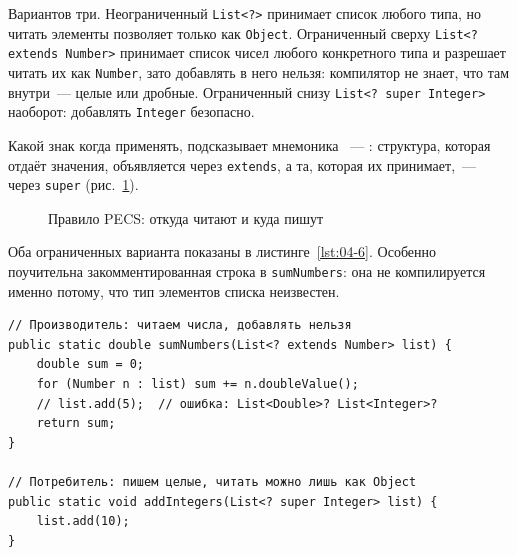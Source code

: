Вариантов три. Неограниченный \texttt{List<?>} принимает список любого типа, но
читать элементы позволяет только как \texttt{Object}. Ограниченный сверху
\texttt{List<? extends Number>} принимает список чисел любого конкретного типа
и разрешает читать их как \texttt{Number}, зато добавлять в него нельзя:
компилятор не знает, что там внутри~--- целые или дробные. Ограниченный снизу
\texttt{List<? super Integer>} наоборот: добавлять \texttt{Integer} безопасно.

Какой знак когда применять, подсказывает мнемоника ~---
: структура, которая отдаёт значения,
объявляется через \texttt{extends}, а та, которая их принимает,~--- через
\texttt{super} (рис.~\ref{fig:04-1}).

\begin{figure}[htbp]\centering
{}
\caption{Правило PECS: откуда читают и куда пишут}\label{fig:04-1}
\end{figure}

Оба ограниченных варианта показаны в листинге~\ref{lst:04-6}. Особенно
поучительна закомментированная строка в \texttt{sumNumbers}: она не
компилируется именно потому, что тип элементов списка неизвестен.

\begin{listing}[H]
\begin{verbatim}
// Производитель: читаем числа, добавлять нельзя
public static double sumNumbers(List<? extends Number> list) {
    double sum = 0;
    for (Number n : list) sum += n.doubleValue();
    // list.add(5);  // ошибка: List<Double>? List<Integer>?
    return sum;
}

// Потребитель: пишем целые, читать можно лишь как Object
public static void addIntegers(List<? super Integer> list) {
    list.add(10);
}
\end{verbatim}
\caption{Подстановочные знаки в параметрах методов}
\label{lst:04-6}
\end{listing}

